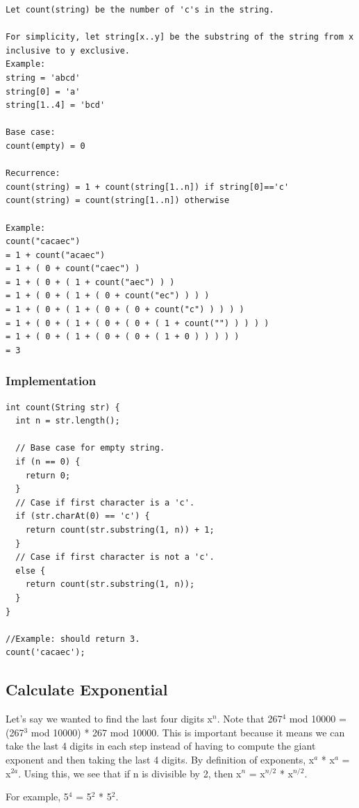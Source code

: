\documentclass[11pt,oneside]{book}
\begin{document}
\begin{lstlisting}
Let count(string) be the number of 'c's in the string.

For simplicity, let string[x..y] be the substring of the string from x inclusive to y exclusive.
Example: 
string = 'abcd'
string[0] = 'a'
string[1..4] = 'bcd'

Base case:
count(empty) = 0

Recurrence:
count(string) = 1 + count(string[1..n]) if string[0]=='c' 
count(string) = count(string[1..n]) otherwise

Example:
count("cacaec")
= 1 + count("acaec") 
= 1 + ( 0 + count("caec") )
= 1 + ( 0 + ( 1 + count("aec") ) )
= 1 + ( 0 + ( 1 + ( 0 + count("ec") ) ) )
= 1 + ( 0 + ( 1 + ( 0 + ( 0 + count("c") ) ) ) )
= 1 + ( 0 + ( 1 + ( 0 + ( 0 + ( 1 + count("") ) ) ) )
= 1 + ( 0 + ( 1 + ( 0 + ( 0 + ( 1 + 0 ) ) ) ) )
= 3
\end{lstlisting}

\subsubsection{Implementation}

\begin{lstlisting}
int count(String str) {
  int n = str.length();

  // Base case for empty string.
  if (n == 0) {
    return 0;
  }
  // Case if first character is a 'c'.
  if (str.charAt(0) == 'c') {
    return count(str.substring(1, n)) + 1;
  }
  // Case if first character is not a 'c'.
  else {
    return count(str.substring(1, n));
  }
}

//Example: should return 3.
count('cacaec');
\end{lstlisting}

\subsection{Calculate Exponential}

Let's say we wanted to find the last four digits x$^{n}$. Note that 267$^{4}$ mod 10000 = (267$^{3}$ mod 10000) * 267 mod 10000. This is important because it means we can take the last 4 digits in each step instead of having to compute the giant exponent and then taking the last 4 digits. By definition of exponents, x$^{a}$ * x$^{a}$ = x$^{2a}$. Using this, we see that if n is divisible by 2, then x$^{n}$ = x$^{n/2}$ * x$^{n/2}$.

For example, 5$^{4}$ = 5$^{2}$ * 5$^{2}$.
\end{document}
